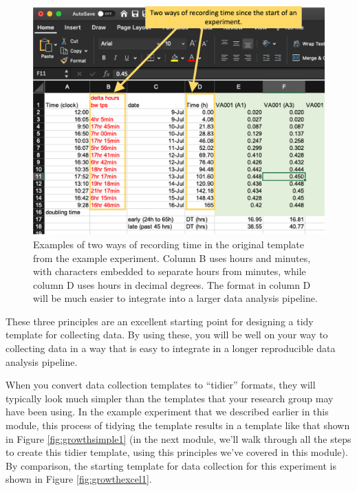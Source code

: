 \documentclass[]{tufte-book}
\begin{document}
\begin{figure}
\includegraphics[width=\textwidth]{figures/growth_curve_recording_time} \caption[Examples of two ways of recording time in the original template from the example experiment]{Examples of two ways of recording time in the original template from the example experiment. Column B uses hours and minutes, with characters embedded to separate hours from minutes, while column D uses hours in decimal degrees. The format in column D will be much easier to integrate into a larger data analysis pipeline.}\label{fig:recordingtime}
\end{figure}

These three principles are an excellent starting point for designing a tidy
template for collecting data. By using these, you will be well on your way to
collecting data in a way that is easy to integrate in a longer reproducible data
analysis pipeline.

When you convert data collection templates to ``tidier'' formats, they will
typically look much simpler than the templates that your research group may have
been using. In the example experiment that we described earlier in this module,
this process of tidying the template results in a template like that shown in
Figure \ref{fig:growthsimple1} (in the next module, we'll walk through all the
steps to create this tidier template, using this principles we've covered in
this module). By comparison, the starting template for data collection for this
experiment is shown in Figure \ref{fig:growthexcel1}.
\end{document}
